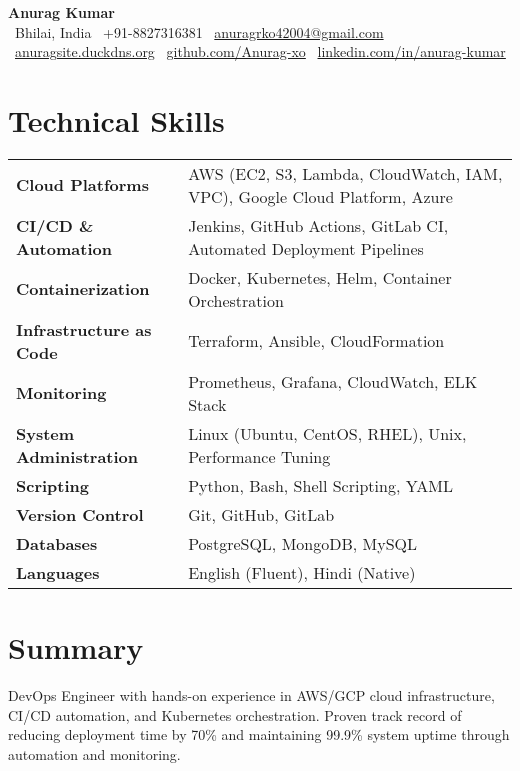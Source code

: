 \documentclass[letterpaper,10pt]{article}
\begin{document}
\begin{center}
    {\Huge\textbf{\color{accentcolor}Anurag Kumar}} \\ \vspace{8pt}
    \small
    \faMapMarker* \ Bhilai, India \quad
    \faPhone \ +91-8827316381 \quad
    \faEnvelope \ \href{mailto:anuragrko42004@gmail.com}{anuragrko42004@gmail.com}
    \\ \vspace{4pt}
    \faGlobe \ \href{http://anuragsite.duckdns.org}{anuragsite.duckdns.org} \quad
    \faGithub \ \href{https://github.com/Anurag-xo}{github.com/Anurag-xo} \quad
    \faLinkedin \ \href{https://www.linkedin.com/in/anurag-kumar-b1a790249}{linkedin.com/in/anurag-kumar}
\end{center}
\vspace{-15pt}

\section{Technical Skills}
\vspace{2pt}
\begin{tabularx}{\textwidth}{@{}l X@{}}
\textbf{Cloud Platforms} & AWS (EC2, S3, Lambda, CloudWatch, IAM, VPC), Google Cloud Platform, Azure \\
\textbf{CI/CD \& Automation} & Jenkins, GitHub Actions, GitLab CI, Automated Deployment Pipelines \\
\textbf{Containerization} & Docker, Kubernetes, Helm, Container Orchestration \\
\textbf{Infrastructure as Code} & Terraform, Ansible, CloudFormation \\
\textbf{Monitoring} & Prometheus, Grafana, CloudWatch, ELK Stack \\
\textbf{System Administration} & Linux (Ubuntu, CentOS, RHEL), Unix, Performance Tuning \\
\textbf{Scripting} & Python, Bash, Shell Scripting, YAML \\
\textbf{Version Control} & Git, GitHub, GitLab \\
\textbf{Databases} & PostgreSQL, MongoDB, MySQL \\
\textbf{Languages} & English (Fluent), Hindi (Native) \\
\end{tabularx}

\section{Summary}
\vspace{2pt}
DevOps Engineer with hands-on experience in AWS/GCP cloud infrastructure, CI/CD automation, and Kubernetes orchestration. Proven track record of reducing deployment time by 70\% and maintaining 99.9\% system uptime through automation and monitoring.
\end{document}
